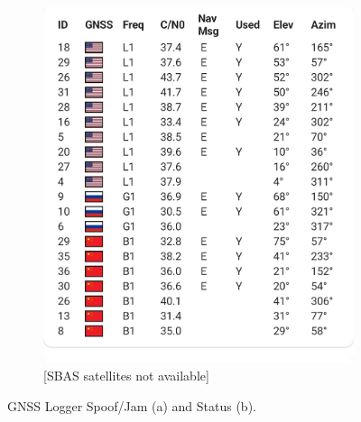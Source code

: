 \begin{figure}[htbp]
\begin{subfigure}{0.23\textwidth}
                \includegraphics[width=\textwidth]{images/screenshots/Screenshot_20250503_GnssLogger_status.jpg}
                \caption{[SBAS satellites not available]}
                \label{fig:gnsslogger_status}
            \end{subfigure}
            \vspace{0.35cm}
            \caption{GNSS Logger Spoof/Jam (a) and Status (b).}
            \label{fig:gnsslogger_2}
        \end{figure}

        \vspace{0.1cm}


